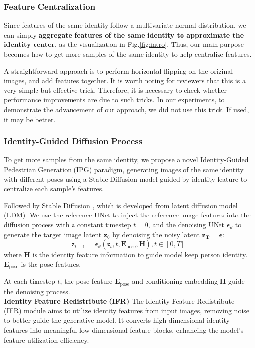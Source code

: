 \subsubsection{Feature Centralization}

Since features of the same identity follow a multivariate normal distribution, we can simply \textbf{aggregate features of the same identity to approximate the identity center}, as the visualization in Fig.\ref{fig:intro}. Thus, our main purpose becomes how to get more samples of the same identity to help centralize features.

\label{flip}
A straightforward approach is to perform horizontal flipping on the original images, and add features together. It is worth noting for reviewers that this is a very simple but effective trick. Therefore, it is necessary to check whether performance improvements are due to such tricks. In our experiments, to demonstrate the advancement of our approach, we did not use this trick. If used, it may be better. 

\subsubsection{Identity-Guided Diffusion Process}
To get more samples from the same identity, we propose a novel Identity-Guided Pedestrian Generation (IPG) paradigm, generating images of the same identity with different poses using a Stable Diffusion model guided by identity feature to centralize each sample's features. 
 
Followed by Stable Diffusion \cite{rombach2022high}, which is developed from latent diffusion model (LDM). We use the reference UNet to inject the reference image features into the diffusion process with a constant timestep \( t = 0 \), and the denoising UNet $\boldsymbol{\epsilon}_{\theta}$ to generate the target image latent \(\mathbf{z_0} \) by denoising the noisy latent \( \mathbf{z_T} = \boldsymbol{\epsilon}\):
\begin{equation}
\mathbf{z}_{t-1}=\boldsymbol{\epsilon}_{\theta}(\mathbf{z}_t, t, \mathbf{E}_{\text{pose}}, \mathbf{H}), t \in [0,T]
\end{equation}
where \( \mathbf{H} \) is the identity feature information to guide model keep person identity. \( \mathbf{E}_{\text{pose}} \) is the pose features.

At each timestep \( t \), the pose feature \( \mathbf{E}_{\text{pose}} \) and conditioning embedding \( \mathbf{H} \) guide the denoising process.
\\
\textbf{Identity Feature Redistribute (IFR)}
The Identity Feature Redistribute (IFR) module aims to utilize identity features from input images, removing noise to better guide the generative model. It converts high-dimensional identity features into meaningful low-dimensional feature blocks, enhancing the model’s feature utilization efficiency.

